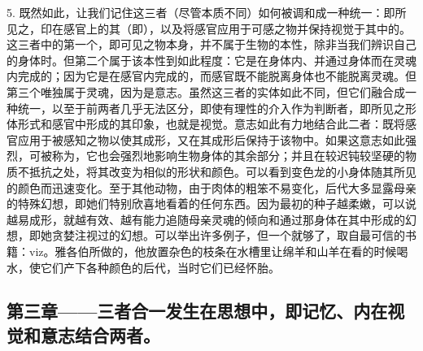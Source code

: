5. 既然如此，让我们记住这三者（尽管本质不同）如何被调和成一种统一：即所见之，印在感官上的其（即），以及将感官应用于可感之物并保持视觉于其中的。这三者中的第一个，即可见之物本身，并不属于生物的本性，除非当我们辨识自己的身体时。但第二个属于该本性到如此程度：它是在身体内、并通过身体而在灵魂内完成的；因为它是在感官内完成的，而感官既不能脱离身体也不能脱离灵魂。但第三个唯独属于灵魂，因为是意志。虽然这三者的实体如此不同，但它们融合成一种统一，以至于前两者几乎无法区分，即使有理性的介入作为判断者，即所见之形体形式和感官中形成的其印象，也就是视觉。意志如此有力地结合此二者：既将感官应用于被感知之物以使其成形，又在其成形后保持于该物中。如果这意志如此强烈，可被称为，它也会强烈地影响生物身体的其余部分；并且在较迟钝较坚硬的物质不抵抗之处，将其改变为相似的形状和颜色。可以看到变色龙的小身体随其所见的颜色而迅速变化。至于其他动物，由于肉体的粗笨不易变化，后代大多显露母亲的特殊幻想，即她们特别欣喜地看着的任何东西。因为最初的种子越柔嫩，可以说越易成形，就越有效、越有能力追随母亲灵魂的倾向和通过那身体在其中形成的幻想，即她贪婪注视过的幻想。可以举出许多例子，但一个就够了，取自最可信的书籍：viz。雅各伯所做的，他放置杂色的枝条在水槽里让绵羊和山羊在看的时候喝水，使它们产下各种颜色的后代，当时它们已经怀胎。\par


\subsection{第三章——三者合一发生在思想中，即记忆、内在视觉和意志结合两者。}

